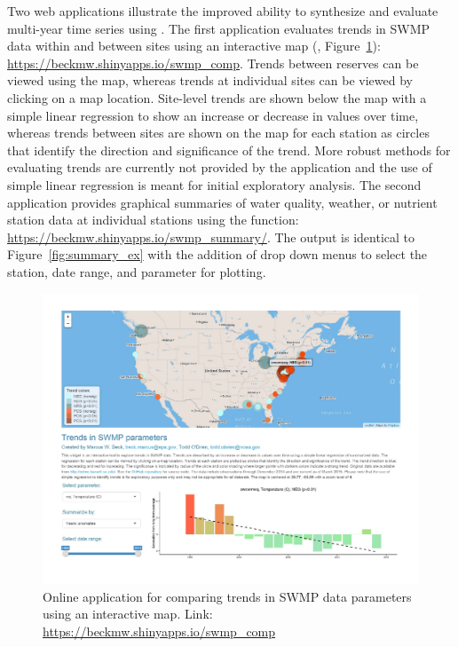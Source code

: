 Two  web applications illustrate the improved ability to synthesize and evaluate multi-year time series using .  The first application evaluates trends in SWMP data within and between sites using an interactive  map (\citet{Cheng15}, Figure~\ref{fig:swmp_comp}): \url{https://beckmw.shinyapps.io/swmp_comp}.  Trends between reserves can be viewed using the map, whereas trends at individual sites can be viewed by clicking on a map location.  Site-level trends are shown below the map with a simple linear regression to show an increase or decrease in values over time, whereas trends between sites are shown on the map for each station as circles that identify the direction and significance of the trend.  More robust methods for evaluating trends are currently not provided by the application and the use of simple linear regression is meant for initial exploratory analysis.  The second application provides graphical summaries of water quality, weather, or nutrient station data at individual stations using the  function: \url{https://beckmw.shinyapps.io/swmp_summary/}.  The output is identical to Figure~\ref{fig:summary_ex} with the addition of drop down menus to select the station, date range, and parameter for plotting.

\begin{figure}[!h]
\begin{center}
\includegraphics[width = \textwidth]{swmp_comp.pdf}
\caption{Online application for comparing trends in SWMP data parameters using an interactive map.  Link: \url{https://beckmw.shinyapps.io/swmp_comp}}
\label{fig:swmp_comp}
\end{center}
\end{figure}

